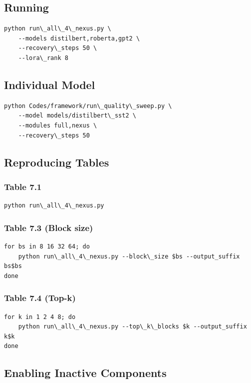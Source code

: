 \subsection{Running}

\begin{lstlisting}
python run\_all\_4\_nexus.py \
    --models distilbert,roberta,gpt2 \
    --recovery\_steps 50 \
    --lora\_rank 8
\end{lstlisting}

\subsection{Individual Model}

\begin{lstlisting}
python Codes/framework/run\_quality\_sweep.py \
    --model models/distilbert\_sst2 \
    --modules full,nexus \
    --recovery\_steps 50
\end{lstlisting}

\subsection{Reproducing Tables}

\subsubsection{Table 7.1}
\begin{lstlisting}
python run\_all\_4\_nexus.py
\end{lstlisting}

\subsubsection{Table 7.3 (Block size)}
\begin{lstlisting}
for bs in 8 16 32 64; do
    python run\_all\_4\_nexus.py --block\_size $bs --output_suffix bs$bs
done
\end{lstlisting}

\subsubsection{Table 7.4 (Top-k)}
\begin{lstlisting}
for k in 1 2 4 8; do
    python run\_all\_4\_nexus.py --top\_k\_blocks $k --output_suffix k$k
done
\end{lstlisting}

\subsection{Enabling Inactive Components}

